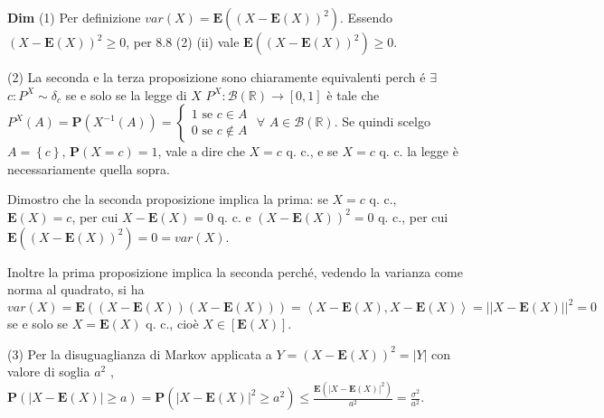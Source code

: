 \documentclass{article}
\begin{document}
\textbf{Dim} (1) Per definizione $var\left( X\right) =\mathbf{E}\left(
\left( X-\mathbf{E}\left( X\right) \right) ^{2}\right) $. Essendo $\left( X-%
\mathbf{E}\left( X\right) \right) ^{2}\geq 0$, per 8.8 (2) (ii) vale $%
\mathbf{E}\left( \left( X-\mathbf{E}\left( X\right) \right) ^{2}\right) \geq
0$.

(2) La seconda e la terza proposizione sono chiaramente equivalenti perch%
\'{e} $\exists $ $c:P^{X}\sim \delta _{c}$ se e solo se la legge di $X$ $%
P^{X}:\mathcal{B}\left( 
\mathbb{R}
\right) \rightarrow \left[ 0,1\right] $ \`{e} tale che $P^{X}\left( A\right)
=\mathbf{P}\left( X^{-1}\left( A\right) \right) =\left\{ 
\begin{array}{c}
1\text{ se }c\in A \\ 
0\text{ se }c\not\in A%
\end{array}%
\right. $ $\forall $ $A\in \mathcal{B}\left( 
\mathbb{R}
\right) $. Se quindi scelgo $A=\left\{ c\right\} $, $\mathbf{P}\left(
X=c\right) =1$, vale a dire che $X=c$ q. c., e se $X=c$ q. c. la legge \`{e}
necessariamente quella sopra.

Dimostro che la seconda proposizione implica la prima: se $X=c$ q. c., $%
\mathbf{E}\left( X\right) =c$, per cui $X-\mathbf{E}\left( X\right) =0$ q.
c. e $\left( X-\mathbf{E}\left( X\right) \right) ^{2}=0$ q. c., per cui $%
\mathbf{E}\left( \left( X-\mathbf{E}\left( X\right) \right) ^{2}\right)
=0=var\left( X\right) $.

Inoltre la prima proposizione implica la seconda perch\'{e}, vedendo la
varianza come norma al quadrato, si ha $var\left( X\right) =\mathbf{E}\left(
\left( X-\mathbf{E}\left( X\right) \right) \left( X-\mathbf{E}\left(
X\right) \right) \right) =\left\langle X-\mathbf{E}\left( X\right) ,X-%
\mathbf{E}\left( X\right) \right\rangle =\left\vert \left\vert X-\mathbf{E}%
\left( X\right) \right\vert \right\vert ^{2}=0$ se e solo se $X=\mathbf{E}%
\left( X\right) $ q. c., cio\`{e} $X\in \left[ \mathbf{E}\left( X\right) %
\right] $.

(3) Per la disuguaglianza di Markov applicata a $Y=\left( X-\mathbf{E}\left(
X\right) \right) ^{2}=\left\vert Y\right\vert $ con valore di soglia $a^{2}$%
, $\mathbf{P}\left( \left\vert X-\mathbf{E}\left( X\right) \right\vert \geq
a\right) =\mathbf{P}\left( \left\vert X-\mathbf{E}\left( X\right)
\right\vert ^{2}\geq a^{2}\right) \leq \frac{\mathbf{E}\left( \left\vert X-%
\mathbf{E}\left( X\right) \right\vert ^{2}\right) }{a^{2}}=\frac{\sigma ^{2}%
}{a^{2}}$.
\end{document}
